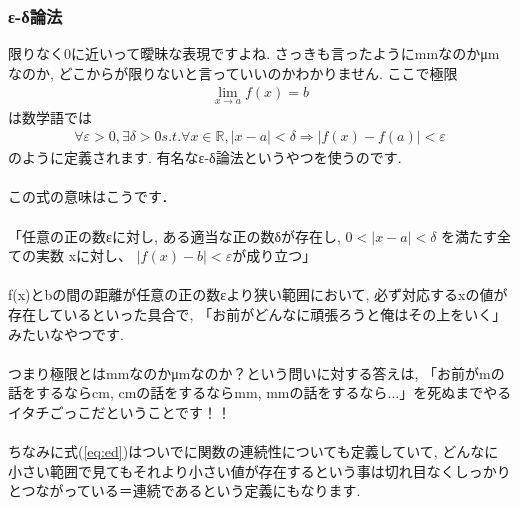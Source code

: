 \documentclass[11pt,a4paper]{jsarticle}
\begin{document}
\subsubsection{ε-δ論法}
限りなく0に近いって曖昧な表現ですよね. さっきも言ったようにmmなのかμmなのか, どこからが限りないと言っていいのかわかりません. ここで極限
\begin{eqnarray}
\lim_{x\to a} f(x) = b
\end{eqnarray}
は数学語では
\begin{eqnarray}
\forall \varepsilon >0, \exists \delta>0  s.t.  \forall x \in \mathbb{R}, |x-a|<\delta \Rightarrow |f(x)-f(a)|<\varepsilon
\label{eq:ed}
\end{eqnarray}
のように定義されます. 有名なε-δ論法というやつを使うのです.\\
\\
この式の意味はこうです．\\
\\
「任意の正の数εに対し, ある適当な正の数δが存在し, $ 0 < |x − a| < δ$ を満たす全ての実数 xに対し、 $|f(x) − b| < ε$が成り立つ」\\
\\
f(x)とbの間の距離が任意の正の数εより狭い範囲において, 必ず対応するxの値が存在しているといった具合で, 「お前がどんなに頑張ろうと俺はその上をいく」みたいなやつです.
\\
\\
つまり極限とはmmなのかμmなのか？という問いに対する答えは, 「お前がmの話をするならcm, cmの話をするならmm, mmの話をするなら...」を死ぬまでやるイタチごっこだということです！！\\
\\
ちなみに式(\ref{eq:ed})はついでに関数の連続性についても定義していて, どんなに小さい範囲で見てもそれより小さい値が存在するという事は切れ目なくしっかりとつながっている＝連続であるという定義にもなります.\\
\end{document}
